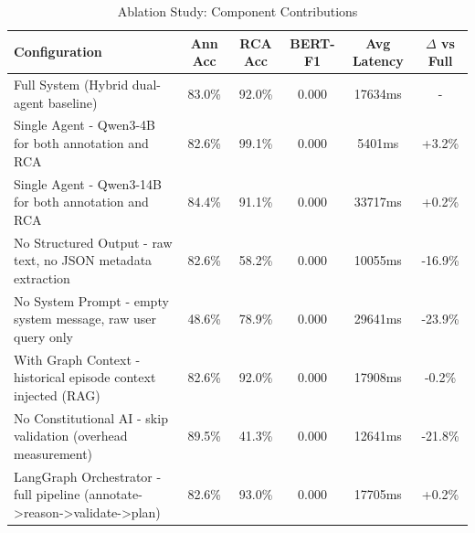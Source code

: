 \begin{table}[h]
\centering
\caption{Ablation Study: Component Contributions}
\label{tab:ablation}
\begin{tabular}{lccccc}
\toprule
\textbf{Configuration} & \textbf{Ann Acc} & \textbf{RCA Acc} & \textbf{BERT-F1} & \textbf{Avg Latency} & \textbf{$\Delta$ vs Full} \\
\midrule
Full System (Hybrid dual-agent baseline) & 83.0\% & 92.0\% & 0.000 & 17634ms & - \\
Single Agent - Qwen3-4B for both annotation and RCA & 82.6\% & 99.1\% & 0.000 & 5401ms & +3.2\% \\
Single Agent - Qwen3-14B for both annotation and RCA & 84.4\% & 91.1\% & 0.000 & 33717ms & +0.2\% \\
No Structured Output - raw text, no JSON metadata extraction & 82.6\% & 58.2\% & 0.000 & 10055ms & -16.9\% \\
No System Prompt - empty system message, raw user query only & 48.6\% & 78.9\% & 0.000 & 29641ms & -23.9\% \\
With Graph Context - historical episode context injected (RAG) & 82.6\% & 92.0\% & 0.000 & 17908ms & -0.2\% \\
No Constitutional AI - skip validation (overhead measurement) & 89.5\% & 41.3\% & 0.000 & 12641ms & -21.8\% \\
LangGraph Orchestrator - full pipeline (annotate->reason->validate->plan) & 82.6\% & 93.0\% & 0.000 & 17705ms & +0.2\% \\
\bottomrule
\end{tabular}
\end{table}
